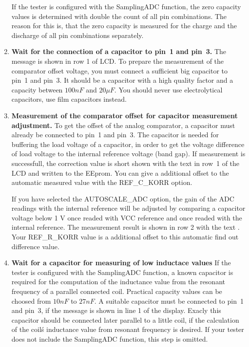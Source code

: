 \begin{enumerate}
If the tester is configured with the SamplingADC function, the zero capacity values is determined
with double the count of all pin combinations. The reason for this is, that the
zero capacity is measured for the charge and the discharge of all pin combinations separately.

\item \textbf {Wait for the connection of a capacitor to pin~1 and pin~3.}
The message  is shown in row 1 of LCD.
To prepare the measurement of the comparator offset voltage, you must connect
a sufficient big capacitor to pin~1 and pin~3.
It should be a capacitor with a high quality factor and a capacity between \(100nF\) and \(20\mu F\).
You should never use electrolytical capacitors, use film capacitors instead.

\item \textbf {Measurement of the comparator offset for capacitor measurement adjustment.}
To get the offset of the analog comparator, a capacitor must already be connected to pin~1 and pin~3.
The capacitor is needed for buffering the load voltage of a capacitor, in order to get the voltage
difference of load voltage to the internal reference voltage (band gap).
If measurement is successfull, the correction value is short shown with the text  in row~1 of 
the LCD and written to the EEprom. You can give a additional offset to the automatic measured value
with the REF\_C\_KORR option.

If you have selected the AUTOSCALE\_ADC option, the gain of the ADC readings with the internal reference
will be adjusted by comparing a capacitor voltage below 1 V once readed with VCC reference and once
readed with the internal reference. 
The measurement result is shown in row 2 with the text . 
Your REF\_R\_KORR value is a additional offset to this automatic find out difference value.

\item \textbf {Wait for a capacitor for measuring of low inductace values}
If the tester is configured with the SamplingADC function, a known capacitor is required for
the computation of the inductance value from the resonant frequency of a parallel connected coil.
Practical capacity values can be choosed from \(10nF\) to \(27nF\). 
A suitable capacitor must be connected to pin~1 and pin~3, if the message  is shown in
line 1 of the display.
Exacly this capacitor should be connected later parallel to a little coil,
if the calculation of the coil\'s inductance value from resonant frequency is desired.
If your tester does not include the SamplingADC function, this step is omitted.

\end{enumerate}

